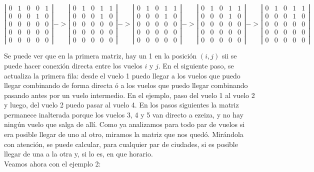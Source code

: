 \documentclass[11pt, a4paper, twoside]{article}
\begin{document}
\[ \left| \begin{array}{ccccc}
  0 & 1 & 0 & 0 & 1 \\
  0 & 0 & 0 & 1 & 0 \\
  0 & 0 & 0 & 0 & 0 \\
  0 & 0 & 0 & 0 & 0 \\
  0 & 0 & 0 & 0 & 0 \end{array} \right| ->
  \left| \begin{array}{ccccc}
  0 & 1 & 0 & 1 & 1 \\
  0 & 0 & 0 & 1 & 0 \\
  0 & 0 & 0 & 0 & 0 \\
  0 & 0 & 0 & 0 & 0 \\
  0 & 0 & 0 & 0 & 0 \end{array} \right| ->
  \left| \begin{array}{ccccc}
  0 & 1 & 0 & 1 & 1 \\
  0 & 0 & 0 & 1 & 0 \\
  0 & 0 & 0 & 0 & 0 \\
  0 & 0 & 0 & 0 & 0 \\
  0 & 0 & 0 & 0 & 0 \end{array} \right| ->
  \left| \begin{array}{ccccc}
  0 & 1 & 0 & 1 & 1 \\
  0 & 0 & 0 & 1 & 0 \\
  0 & 0 & 0 & 0 & 0 \\
  0 & 0 & 0 & 0 & 0 \\
  0 & 0 & 0 & 0 & 0 \end{array} \right| ->
  \left| \begin{array}{ccccc}
  0 & 1 & 0 & 1 & 1 \\
  0 & 0 & 0 & 1 & 0 \\
  0 & 0 & 0 & 0 & 0 \\
  0 & 0 & 0 & 0 & 0 \\
  0 & 0 & 0 & 0 & 0 \end{array} \right|
\] 

Se puede ver que en la primera matriz, hay un 1 en la posición $(i,j)$ sii se
puede hacer conexión directa entre los vuelos $i$ y $j$. En el siguiente paso, 
se actualiza la primera fila: desde el vuelo 1 puedo llegar a los vuelos que puedo
llegar combinando de forma directa ó a los vuelos que puedo llegar combinando 
pasando antes por un vuelo intermedio. En el ejemplo, paso del vuelo 1 al vuelo 2 
y luego, del vuelo 2 puedo pasar al vuelo 4. En los pasos siguientes la matriz
permanece inalterada porque los vuelos 3, 4 y 5 van directo a ezeiza, y no hay
ningún vuelo que salga de allí. Como ya analizamos para todo par de vuelos si era
posible llegar de uno al otro, miramos la matriz que nos quedó. Mirándola con
atención, se puede calcular, para cualquier par de ciudades, si es posible llegar
de una a la otra y, si lo es, en que horario. \\
Veamos ahora con el ejemplo 2: \\
\end{document}

